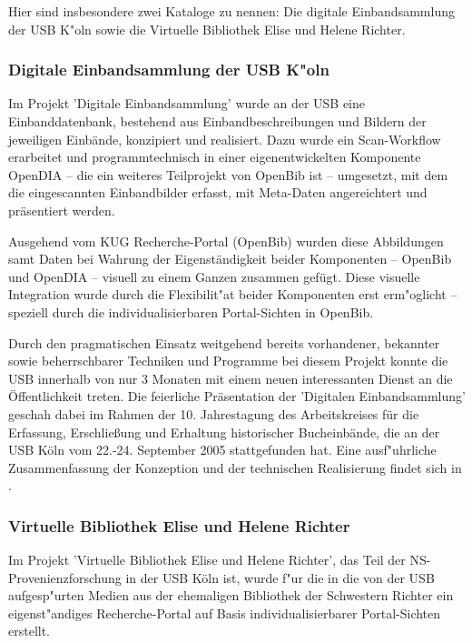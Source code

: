\documentclass[11pt, twoside, a4paper, BCOR8mm, DIV12, bibtotoc,idxtotoc]{scrbook}
\begin{document}
Hier sind insbesondere zwei Kataloge zu nennen: Die digitale
Einbandsammlung der USB K"oln sowie die Virtuelle Bibliothek Elise und
Helene Richter.


\subsubsection{Digitale Einbandsammlung der USB K"oln}

Im Projekt 'Digitale Einbandsammlung' wurde an der USB eine
Einbanddatenbank, bestehend aus Einbandbeschreibungen und Bildern der
jeweiligen Einbände, konzipiert und realisiert. Dazu wurde ein
Scan-Workflow erarbeitet und programmtechnisch in einer
eigenentwickelten Kom\-po\-nen\-te OpenDIA -- die ein weiteres Teilprojekt
von OpenBib ist -- umgesetzt, mit dem die eingescannten Einbandbilder
erfasst, mit Meta-Daten angereichtert und präsentiert werden.

Ausgehend vom KUG Recherche-Portal (OpenBib) wurden diese Abbildungen
samt Daten bei Wahrung der Eigenständigkeit beider Kom\-po\-nen\-ten --
OpenBib und OpenDIA -- visuell zu einem Ganzen zusammen gefügt. Diese
visuelle Integration wurde durch die Flexibilit"at beider Kom\-po\-nen\-ten
erst erm"oglicht -- speziell durch die individualisierbaren
Portal-Sichten in OpenBib. 

Durch den pragmatischen Einsatz weitgehend bereits vorhandener,
bekannter sowie beherrschbarer Techniken und Programme bei diesem
Projekt konnte die USB innerhalb von nur 3 Monaten mit einem neuen
interessanten Dienst an die Öffentlichkeit treten. Die feierliche
Präsentation der 'Digitalen Einbandsammlung' geschah dabei im Rahmen
der 10.  Jahrestagung des Arbeitskreises für die Erfassung,
Erschließung und Erhaltung historischer Bucheinbände, die an der USB
Köln vom 22.-24.  September 2005 stattgefunden hat.  Eine
ausf"uhrliche Zusammenfassung der Kon\-zep\-tion und der technischen
Realisierung findet sich in \cite{BoeFli:EinbandDB}.


\subsubsection{Virtuelle Bibliothek Elise und Helene Richter}

Im Projekt 'Virtuelle Bibliothek Elise und Helene Richter', das Teil
der NS-Provenienzforschung in der USB Köln ist, wurde f"ur die
in die von der USB aufgesp"urten Medien aus der ehemaligen Bibliothek
der Schwestern Richter ein eigenst"andiges Recherche-Portal auf Basis
indi\-vi\-duali\-sierbarer Portal-Sichten erstellt.
\end{document}
